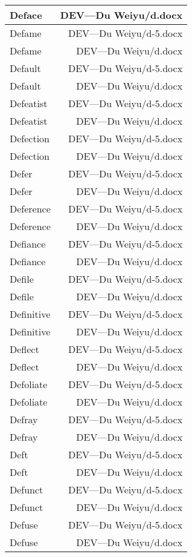 \documentclass{article}
\begin{document}
\begin{center}
\begin{longtable}{|l|r|}
\hline
Deface  &  DEV---Du Weiyu/d.docx\\  
\hline
Defame  &  DEV---Du Weiyu/d-5.docx\\  
\hline
Defame  &  DEV---Du Weiyu/d.docx\\  
\hline
Default  &  DEV---Du Weiyu/d-5.docx\\  
\hline
Default  &  DEV---Du Weiyu/d.docx\\  
\hline
Defeatist  &  DEV---Du Weiyu/d-5.docx\\  
\hline
Defeatist  &  DEV---Du Weiyu/d.docx\\  
\hline
Defection  &  DEV---Du Weiyu/d-5.docx\\  
\hline
Defection  &  DEV---Du Weiyu/d.docx\\  
\hline
Defer  &  DEV---Du Weiyu/d-5.docx\\  
\hline
Defer  &  DEV---Du Weiyu/d.docx\\  
\hline
Deference  &  DEV---Du Weiyu/d-5.docx\\  
\hline
Deference  &  DEV---Du Weiyu/d.docx\\  
\hline
Defiance  &  DEV---Du Weiyu/d-5.docx\\  
\hline
Defiance  &  DEV---Du Weiyu/d.docx\\  
\hline
Defile  &  DEV---Du Weiyu/d-5.docx\\  
\hline
Defile  &  DEV---Du Weiyu/d.docx\\  
\hline
Definitive  &  DEV---Du Weiyu/d-5.docx\\  
\hline
Definitive  &  DEV---Du Weiyu/d.docx\\  
\hline
Deflect  &  DEV---Du Weiyu/d-5.docx\\  
\hline
Deflect  &  DEV---Du Weiyu/d.docx\\  
\hline
Defoliate  &  DEV---Du Weiyu/d-5.docx\\  
\hline
Defoliate  &  DEV---Du Weiyu/d.docx\\  
\hline
Defray  &  DEV---Du Weiyu/d-5.docx\\  
\hline
Defray  &  DEV---Du Weiyu/d.docx\\  
\hline
Deft  &  DEV---Du Weiyu/d-5.docx\\  
\hline
Deft  &  DEV---Du Weiyu/d.docx\\  
\hline
Defunct  &  DEV---Du Weiyu/d-5.docx\\  
\hline
Defunct  &  DEV---Du Weiyu/d.docx\\  
\hline
Defuse  &  DEV---Du Weiyu/d-5.docx\\  
\hline
Defuse  &  DEV---Du Weiyu/d.docx\\  

\end{longtable}
\end{center}
\end{document}
